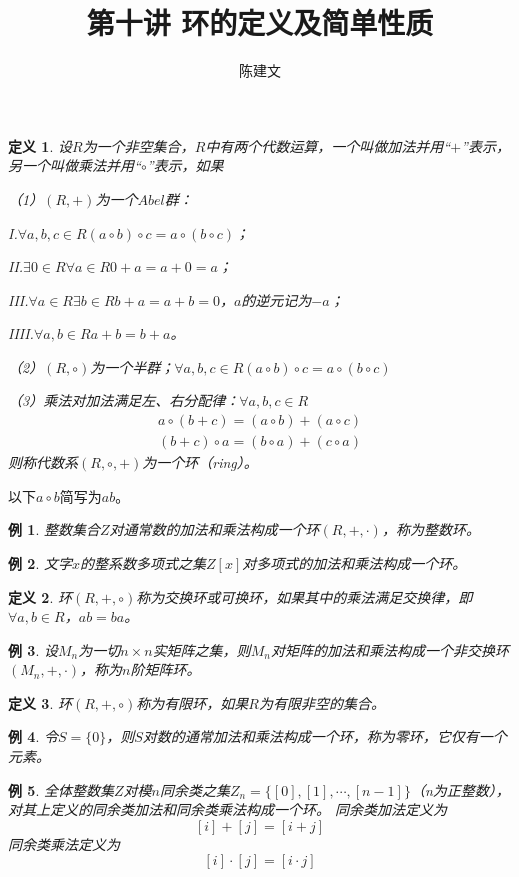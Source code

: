 \documentclass{article}
\newtheorem{Def}{定义}
\newtheorem*{Example}{例}
\begin{document}
\begin{CJK*}{UTF8}{gbsn}
  \title{第十讲 环的定义及简单性质}
  \author{陈建文}
  \maketitle
  \begin{Def}
    设$R$为一个非空集合，$R$中有两个代数运算，一个叫做加法并用“$+$”表示，另一个叫做乘法并用“$\circ$”表示，如果
  
    （1）$(R,+)$为一个$Abel$群：
  
    I.$\forall a,b,c\in R(a\circ b)\circ c=a\circ (b\circ c)$；
  
    II.$\exists 0\in R \forall a\in R 0+a=a+0=a$；
  
    III.$\forall a\in R \exists b\in R b+a = a+b =0$，$a$的逆元记为$-a$；
  
    IIII.$\forall a,b\in R a+b=b+a$。
  
    （2）$(R,\circ)$为一个半群；$\forall a,b,c\in R (a\circ b)\circ c=a\circ (b\circ c)$
  
    （3）乘法对加法满足左、右分配律：$\forall a,b,c\in R$
  \begin{align*}
    a\circ(b+c)=(a\circ b)+(a\circ c)\\
    (b+c)\circ a=(b\circ a) + (c\circ a)
  \end{align*}
  则称代数系$(R,\circ,+)$为一个环（ring）。
  \end{Def}
  以下$a\circ b$简写为$ab$。
  \begin{Example}
    整数集合$Z$对通常数的加法和乘法构成一个环$(R,+,\cdot)$，称为整数环。
  \end{Example}
  
  \begin{Example}
    文字$x$的整系数多项式之集$Z[x]$对多项式的加法和乘法构成一个环。
  \end{Example}
  
  \begin{Def}
  环$(R,+,\circ)$称为交换环或可换环，如果其中的乘法满足交换律，即$\forall a,b\in R$，$ab=ba$。
  \end{Def}
  
  \begin{Example}
    设$M_n$为一切$n\times n$实矩阵之集，则$M_n$对矩阵的加法和乘法构成一个非交换环$(M_n,+,\cdot)$，称为$n$阶矩阵环。
  \end{Example}
  
  \begin{Def}
    环$(R,+,\circ)$称为有限环，如果$R$为有限非空的集合。
  \end{Def}
  \begin{Example}
    令$S=\{0\}$，则$S$对数的通常加法和乘法构成一个环，称为零环，它仅有一个元素。
  \end{Example}
  \begin{Example}
    全体整数集$Z$对模$n$同余类之集$Z_n=\{[0],[1],\cdots,[n-1]\}$（n为正整数），对其上定义的同余类加法和同余类乘法构成一个环。
    同余类加法定义为
    \[[i]+[j]=[i+j]\]
    同余类乘法定义为
    \[[i]\cdot [j]=[i\cdot j]\]
  

\end{Example}
\end{CJK*}
\end{document}
